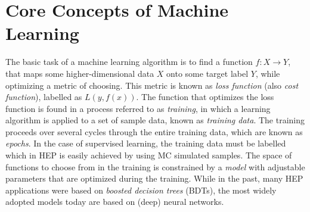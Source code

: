 


\section{Core Concepts of Machine Learning}
\label{sec:core-concepts}
The basic task of a machine learning algorithm is to find a function $f: X \rightarrow Y$, that maps some higher-dimensional data $X$ onto some target label $Y$, while optimizing a metric of choosing.
This metric is known as \emph{loss function} (also \emph{cost function}), labelled as $L(y, f(x))$.
The function that optimizes the loss function is found in a process referred to as \emph{training}, in which a learning algorithm is applied to a set of sample data, known as \emph{training data}.
The training proceeds over several cycles through the entire training data, which are known as \emph{epochs}. 
In the case of supervised learning, the training data must be labelled which in HEP is easily achieved by using MC simulated samples. 
The space of functions to choose from in the training is constrained by a \emph{model} with adjustable parameters that are optimized during the training.
While in the past, many HEP applications were based on \emph{boosted decision trees} (BDTs), the most widely adopted models today are based on (deep) neural networks.

